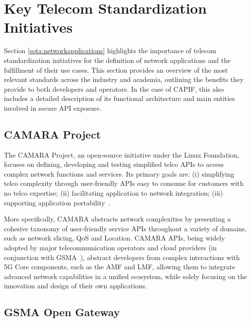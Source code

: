 \section{Key Telecom Standardization Initiatives} \label{sota:telcoinitiatives}

Section \ref{sota:networkapplications} highlights the importance of telecom standardization initiatives for the definition of network applications and the fulfillment of their use cases. This section provides an overview of the most relevant standards across the industry and academia, outlining the benefits they provide to both developers and operators. In the case of \acs{CAPIF}, this also includes a detailed description of its functional architecture and main entities involved in secure \acs{API} exposure.

\subsection{CAMARA Project} \label{sec:iniatives:CAMARA}


The CAMARA Project, an open-source initiative under the Linux Foundation, focuses on defining, developing and testing simplified telco \acsp{API} to access complex network functions and services. Its primary goals are: (i) simplifying telco complexity through user-friendly \acsp{API} easy to consume for customers with no telco expertise; (ii) facilitating application to network integration; (iii) supporting application portability~\cite{CAMARAProject}.

More specifically, CAMARA abstracts network complexities by presenting a cohesive taxonomy of user-friendly service \acsp{API} throughout a variety of domains, such as network slicing, \ac{QoS} and Location. CAMARA \acsp{API}, being widely adopted by major telecommunication operators and cloud providers (in conjunction with \acs{GSMA}~\cite{CAMARAGSMAindustry}), abstract developers from complex interactions with \ac{5G} Core components, such as the \ac{AMF} and \ac{LMF}, allowing them to integrate advanced network capabilities in a unified ecosystem, while solely focusing on the innovation and design of their own applications.


\subsection{GSMA Open Gateway}

